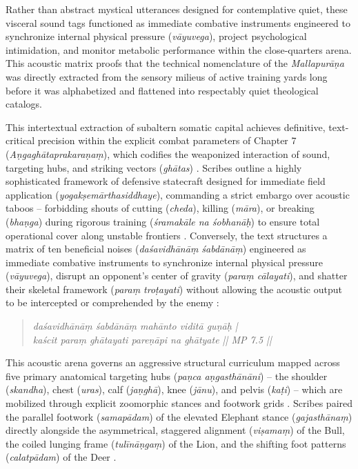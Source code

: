 \documentclass[11pt,twoside,letterpaper]{article}
\begin{document}
Rather than abstract mystical utterances designed for contemplative quiet, these visceral sound tags functioned as immediate combative instruments engineered to synchronize internal physical pressure (\textit{v\={a}yuvega}), project psychological intimidation, and monitor metabolic performance within the close-quarters arena. This acoustic matrix proofs that the technical nomenclature of the \textit{Mallapur\={a}\d{n}a} was directly extracted from the sensory milieus of active training yards long before it was alphabetized and flattened into respectably quiet theological catalogs.

This intertextual extraction of subaltern somatic capital achieves definitive, text-critical precision within the explicit combat parameters of Chapter 7 (\textit{A\d{n}gagh\={a}taprakara\d{n}a\d{m}}), which codifies the weaponized interaction of sound, targeting hubs, and striking vectors (\textit{gh\={a}tas}) \citep{MP_7_v37}. Scribes outline a highly sophisticated framework of defensive statecraft designed for immediate field application (\textit{yogak\d{s}em\={a}rthasiddhaye}), commanding a strict embargo over acoustic taboos -- forbidding shouts of cutting (\textit{cheda}), killing (\textit{m\={a}ra}), or breaking (\textit{bha\d{n}ga}) during rigorous training (\textit{\'sramak\={a}le na \'sobhan\={a}\d{h}}) to ensure total operational cover along unstable frontiers \citep{MP_7_v38}. Conversely, the text structures a matrix of ten beneficial noises (\textit{da\'savidh\={a}n\={a}\d{m} \'sabd\={a}n\={a}\d{m}}) engineered as immediate combative instruments to synchronize internal physical pressure (\textit{v\={a}yuvega}), disrupt an opponent's center of gravity (\textit{para\d{m} c\={a}layati}), and shatter their skeletal framework (\textit{para\d{m} tro\d{t}ayati}) without allowing the acoustic output to be intercepted or comprehended by the enemy \citep{MP_7_v39}:

\begin{quote}
\small
\textit{da\'savidh\={a}n\={a}\d{m} \'sabd\={a}n\={a}\d{m} mah\={a}nto vidit\={a} gu\d{n}\={a}\d{h} | \\
ka\'scit para\d{m} gh\={a}tayati pare\d{n}\={a}pi na gh\={a}tyate || MP 7.5 ||}
\end{quote}

This acoustic arena governs an aggressive structural curriculum mapped across five primary anatomical targeting hubs (\textit{pa\d{n}ca a\d{n}gasth\={a}n\={a}ni}) -- the shoulder (\textit{skandha}), chest (\textit{uras}), calf (\textit{ja\d{n}gh\={a}}), knee (\textit{j\={a}nu}), and pelvis (\textit{ka\d{t}i}) -- which are mobilized through explicit zoomorphic stances and footwork grids \citep{MP_7_v40}. Scribes paired the parallel footwork (\textit{samap\={a}dam}) of the elevated Elephant stance (\textit{gajasth\={a}na\d{m}}) directly alongside the asymmetrical, staggered alignment (\textit{vi\d{s}ama\d{m}}) of the Bull, the coiled lunging frame (\textit{tul\={i}n\={a}\d{n}ga\d{m}}) of the Lion, and the shifting foot patterns (\textit{calatp\={a}dam}) of the Deer \citep{MP_7_v41}. 
\end{document}
